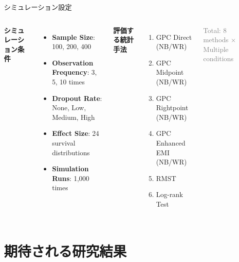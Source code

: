 \documentclass[11pt,aspectratio=169]{beamer}
\begin{document}
\begin{frame}{シミュレーション設定}
\begin{columns}
\textbf{シミュレーション条件}
\begin{itemize}
\item \textbf{Sample Size}: 100, 200, 400
\item \textbf{Observation Frequency}: 3, 5, 10 times
\item \textbf{Dropout Rate}: None, Low, Medium, High
\item \textbf{Effect Size}: 24 survival distributions
\item \textbf{Simulation Runs}: 1,000 times
\end{itemize}

\textbf{評価する統計手法}
\begin{enumerate}
\item GPC Direct (NB/WR)
\item GPC Midpoint (NB/WR)
\item GPC Rightpoint (NB/WR)
\item GPC Enhanced EMI (NB/WR)
\item RMST
\item Log-rank Test
\end{enumerate}

\vspace{0.5em}
\textcolor{gray}{\small Total: 8 methods × Multiple conditions}
\end{columns}
\end{frame}

\section{期待される研究結果}
\end{document}
